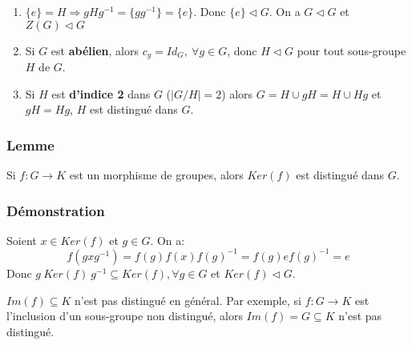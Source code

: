 \documentclass[a4paper, oneside]{report}
\theoremstyle{break}
\newcommand{\sg}{sous-groupe }
\newcommand{\dem}{\subsubsection{Démonstration}}
\begin{document}
\exem
\begin{enumerate}
\item $\{e\}=H \Rightarrow gHg^{-1}=\{gg^{-1}\}=\{e\}$. Donc $\{e\}\vartriangleleft G$. On a $G\vartriangleleft G$ et $Z(G)\vartriangleleft G$
\item Si $G$ est \textbf{abélien}, alors $c_g=Id_G,~\forall g\in G$, donc $H\vartriangleleft G$ pour tout \sg $H$ de $G$.
\item Si $H$ est \textbf{d'indice 2} dans $G$ ($|G/H|=2$) alors $G=H\cup gH=H\cup Hg$ et $gH=Hg$, $H$ est distingué dans $G$.
\end{enumerate}

\subsubsection{Lemme}
Si $f:G\rightarrow K$ est un morphisme de groupes, alors $Ker(f)$ est distingué dans $G$.

\dem
Soient $x\in Ker(f)$ et $g\in G$. On a:
$$f(gxg^{-1})=f(g)f(x)f(g)^{-1}=f(g)ef(g)^{-1}=e$$
Donc $g~Ker(f)~g^{-1}\subseteq Ker(f),\forall g\in G$ et $Ker(f)\vartriangleleft G$.

\remar
$Im(f)\subseteq K$ n'est pas distingué en général. Par exemple, si $f:G\rightarrow K$ est l'inclusion d'un \sg non distingué, alors $Im(f)=G\subseteq K$ n'est pas distingué.
\end{document}
